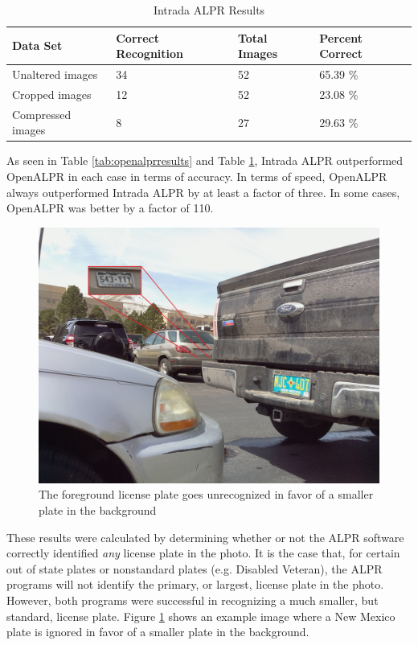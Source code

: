 \documentclass[11pt, oneside, fullpage, doublespace]{article}
\begin{document}
\begin{table}[h!]
\begin{center}
\begin{tabular}{| l || l | l | l |}
\hline
Data Set & Correct Recognition & Total Images & Percent Correct \\ \hline
Unaltered images & 34 & 52 & 65.39 \% \\ \hline
Cropped images & 12 & 52 & 23.08 \% \\ \hline
Compressed images & 8 & 27 & 29.63 \% \\ \hline
\end{tabular}
\end{center}
\caption{Intrada ALPR Results}
\label{tab:intradaresults}
\end{table}

As seen in Table \ref{tab:openalprresults} and Table \ref{tab:intradaresults}, Intrada ALPR outperformed OpenALPR in each case in terms of accuracy. In terms of speed, OpenALPR always outperformed Intrada ALPR by at least a factor of three. In some cases, OpenALPR was better by a factor of 110.

\begin{figure}
\begin{center}
\includegraphics[width=4.5in]{unexpectedrecognition}
\end{center}
\caption{The foreground license plate goes unrecognized in favor of a smaller plate in the background}
\label{fig:unexpectedrecognition}
\end{figure}

These results were calculated by determining whether or not the ALPR software correctly identified \emph{any} license plate in the photo. It is the case that, for certain out of state plates or nonstandard plates (e.g. Disabled Veteran), the ALPR programs will not identify the primary, or largest, license plate in the photo. However, both programs were successful in recognizing a much smaller, but standard, license plate. Figure \ref{fig:unexpectedrecognition} shows an example image where a New Mexico plate is ignored in favor of a smaller plate in the background.
\end{document}
